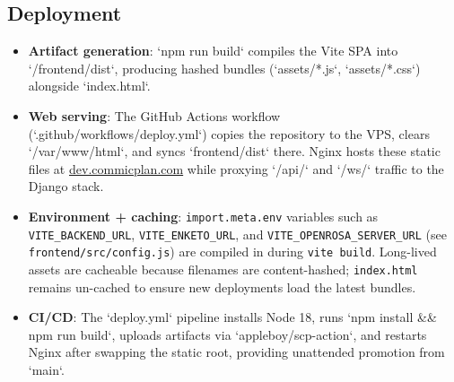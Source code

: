 \documentclass[11pt]{article}
\begin{document}
\subsection{Deployment}
\begin{itemize}[leftmargin=*]
  \item \textbf{Artifact generation}: `npm run build` compiles the Vite SPA into `/frontend/dist`, producing hashed bundles (`assets/*.js`, `assets/*.css`) alongside `index.html`.
  \item \textbf{Web serving}: The GitHub Actions workflow (`.github/workflows/deploy.yml`) copies the repository to the VPS, clears `/var/www/html`, and syncs `frontend/dist` there. Nginx hosts these static files at \href{https://dev.commicplan.com}{dev.commicplan.com} while proxying `/api/` and `/ws/` traffic to the Django stack.
  \item \textbf{Environment + caching}: \texttt{import.meta.env} variables such as \texttt{VITE\_BACKEND\_URL}, \texttt{VITE\_ENKETO\_URL}, and \texttt{VITE\_OPENROSA\_SERVER\_URL} (see \texttt{frontend/src/config.js}) are compiled in during \texttt{vite build}. Long-lived assets are cacheable because filenames are content-hashed; \texttt{index.html} remains un-cached to ensure new deployments load the latest bundles.
  \item \textbf{CI/CD}: The `deploy.yml` pipeline installs Node 18, runs `npm install \&\& npm run build`, uploads artifacts via `appleboy/scp-action`, and restarts Nginx after swapping the static root, providing unattended promotion from `main`.
\end{itemize}
\end{document}
